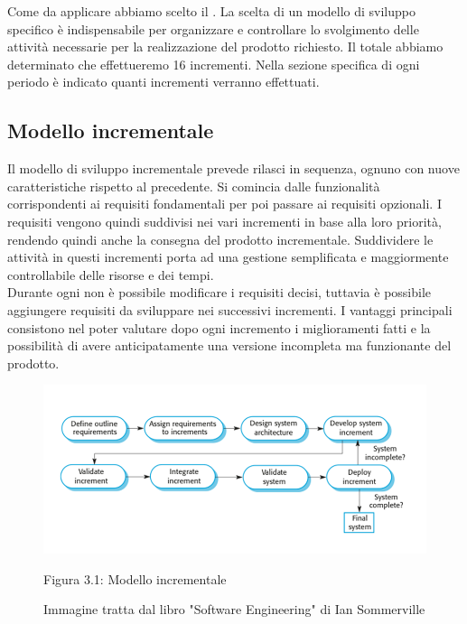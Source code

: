 Come  da applicare abbiamo scelto il . La scelta di un modello di sviluppo specifico è indispensabile per organizzare e controllare lo svolgimento delle attività necessarie per la realizzazione del prodotto richiesto. Il totale abbiamo determinato che effettueremo 16 incrementi. Nella sezione specifica di ogni periodo è indicato quanti incrementi verranno effettuati.

\subsection{Modello incrementale}
Il modello di sviluppo incrementale prevede rilasci in sequenza, ognuno con nuove caratteristiche rispetto al precedente. Si comincia dalle funzionalità corrispondenti ai requisiti fondamentali per poi passare ai requisiti opzionali. I requisiti vengono quindi suddivisi nei vari incrementi in base alla loro priorità, rendendo quindi anche la consegna del prodotto incrementale.
Suddividere le attività in questi incrementi porta ad una gestione semplificata e maggiormente controllabile delle risorse e dei tempi.\\
Durante ogni  non è possibile modificare i requisiti decisi, tuttavia è possibile aggiungere requisiti da sviluppare nei successivi incrementi.
I vantaggi principali consistono nel poter valutare dopo ogni incremento i miglioramenti fatti e la possibilità di avere anticipatamente una versione incompleta ma funzionante del prodotto. \\
\begin{center}
\begin{figure} [H]
	\centering
	\includegraphics[scale=0.65]{Img/Schema_modello_incrementale}
	\caption{Figura 3.1: Modello incrementale}\label{}
	\caption{Immagine tratta dal libro "Software Engineering" di Ian Sommerville}\label{}	
\end{figure}
\end{center}
